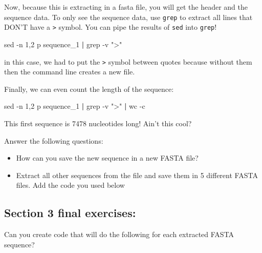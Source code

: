 \documentclass[
]{book}
\newenvironment{Shaded}{\begin{snugshade}}{\end{snugshade}}
\newcommand{\AttributeTok}[1]{\textcolor[rgb]{0.77,0.63,0.00}{#1}}
\newcommand{\FunctionTok}[1]{\textcolor[rgb]{0.00,0.00,0.00}{#1}}
\newcommand{\KeywordTok}[1]{\textcolor[rgb]{0.13,0.29,0.53}{\textbf{#1}}}
\newcommand{\NormalTok}[1]{#1}
\newcommand{\StringTok}[1]{\textcolor[rgb]{0.31,0.60,0.02}{#1}}
\providecommand{\tightlist}{%
  \setlength{\itemsep}{0pt}\setlength{\parskip}{0pt}}
\begin{document}
Now, because this is extracting in a fasta file, you will get the header and the sequence data. To only see the sequence data, use \texttt{grep} to extract all lines that DON'T have a \texttt{\textgreater{}} symbol. You can pipe the results of \texttt{sed} into \texttt{grep}!

\begin{Shaded}
\begin{Highlighting}[]
\FunctionTok{sed} \AttributeTok{{-}n} \StringTok{\textquotesingle{}1,2 p\textquotesingle{}}\NormalTok{ sequence\_1 }\KeywordTok{|} \FunctionTok{grep} \AttributeTok{{-}v} \StringTok{"\textgreater{}"} 
\end{Highlighting}
\end{Shaded}

in this case, we had to put the \texttt{\textgreater{}} symbol between quotes because without them then the command line creates a new file.

Finally, we can even count the length of the sequence:

\begin{Shaded}
\begin{Highlighting}[]
\FunctionTok{sed} \AttributeTok{{-}n} \StringTok{\textquotesingle{}1,2 p\textquotesingle{}}\NormalTok{ sequence\_1 }\KeywordTok{|} \FunctionTok{grep} \AttributeTok{{-}v} \StringTok{"\textgreater{}"} \KeywordTok{|} \FunctionTok{wc} \AttributeTok{{-}c} 
\end{Highlighting}
\end{Shaded}

This first sequence is 7478 nucleotides long! Ain't this cool?

Answer the following questions:

\begin{itemize}
\tightlist
\item
  How can you save the new sequence in a new FASTA file?
\item
  Extract all other sequences from the file and save them in 5 different FASTA files. Add the code you used below
\end{itemize}

\hypertarget{section-3-final-exercises}{%
\subsection{Section 3 final exercises:}\label{section-3-final-exercises}}

Can you create code that will do the following for each extracted FASTA sequence?
\end{document}
